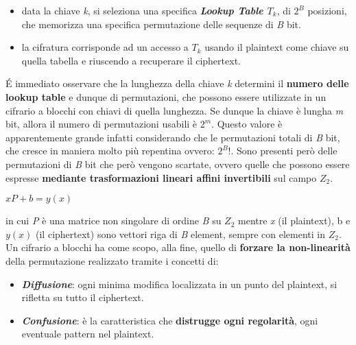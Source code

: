 \begin{itemize}
    \item data la chiave \textit{k}, si seleziona una specifica \textbf{\textit{Lookup Table $T_k$}}, di $2^\textit{B}$ posizioni, che memorizza una specifica permutazione delle sequenze di \textit{B} bit.
    \item la cifratura corrisponde ad un accesso a $T_k$ usando il plaintext come chiave su quella tabella e riuscendo a recuperare il ciphertext.
\end{itemize}
\'{E} immediato osservare che la lunghezza della chiave \textit{k} determini il \textbf{numero delle lookup table} e dunque di permutazioni, che possono essere utilizzate in un cifrario a blocchi con chiavi di quella lunghezza. Se dunque la chiave è lungha \textit{m} bit, allora il numero di permutazioni usabili è $2^m$. Questo valore è apparentemente grande infatti considerando che le permutazioni totali di \textit{B} bit, che cresce in maniera molto più repentina ovvero: $2^B!$. Sono presenti però delle permutazioni di \textit{B} bit che però vengono scartate, ovvero quelle che possono essere espresse \textbf{mediante trasformazioni lineari affini invertibili} sul campo $Z_2$.
\begin{center}
    \begin{math}
        xP + b = y(x)
    \end{math}
\end{center}
in cui \textit{P} è una matrice non singolare di ordine \textit{B} su $Z_2$ mentre \textit{x} (il plaintext), b e $y(x)$ (il ciphertext) sono vettori riga di \textit{B} element, sempre con elementi in $Z_2$.
\\ \newline
Un cifrario a blocchi ha come scopo, alla fine, quello di \textbf{forzare la non-linearità} della permutazione realizzato tramite i concetti di:
\begin{itemize}
    \item \textbf{\textit{Diffusione}}: ogni minima modifica localizzata in un punto del plaintext, si rifletta su tutto il ciphertext.
    \item \textbf{\textit{Confusione}}: è la caratteristica che \textbf{distrugge ogni regolarità}, ogni eventuale pattern nel plaintext.
\end{itemize}


